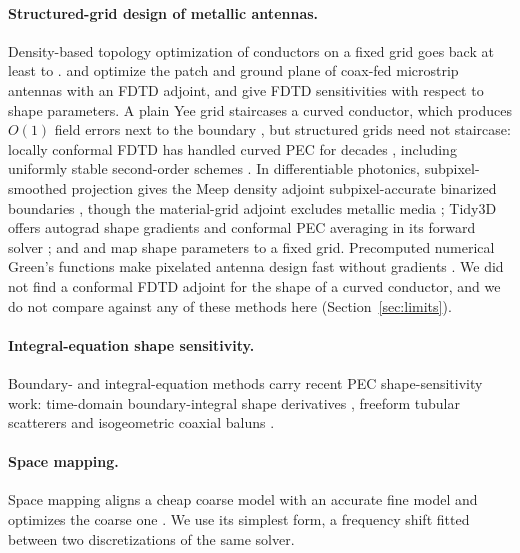 \documentclass{anvil-paper}
\begin{document}
\paragraph{Structured-grid design of metallic antennas.}
Density-based topology optimization of conductors on a fixed grid goes
back at least to \citet{erentok2011topology}. \citet{hassan2014topology}
and \citet{hassan2014patch} optimize the patch and ground plane of
coax-fed microstrip antennas with an FDTD adjoint, and
\citet{nikolova2004sensitivity,nikolova2006scattering} give FDTD
sensitivities with respect to shape parameters. A plain Yee grid
staircases a curved conductor, which produces $O(1)$ field errors next to
the boundary \citep{cangellaris1991analysis,haggblad2014accuracy}, but
structured grids need not staircase: locally conformal FDTD has handled
curved PEC for decades \citep{dey1997locally,mittra2000conformal},
including uniformly stable second-order schemes
\citep{zagorodnov2003uniformly,benkler2006new}. In differentiable
photonics, subpixel-smoothed projection gives the Meep density adjoint
subpixel-accurate binarized boundaries \citep{hammond2025unifying,romano2026ssp2},
though the material-grid adjoint excludes metallic media
\citep{meepadjointdocs}; Tidy3D offers autograd shape gradients and
conformal PEC averaging in its forward solver \citep{tidy3dautograd}; and
\citet{hooten2025} and \citet{liu2024imagerep} map shape parameters to a
fixed grid. Precomputed numerical Green's functions make pixelated antenna
design fast without gradients \citep{sun2025pngf}. We did not find a
conformal FDTD adjoint for the shape of a curved conductor, and we do not
compare against any of these methods here (Section~\ref{sec:limits}).

\paragraph{Integral-equation shape sensitivity.}
Boundary- and integral-equation methods carry recent PEC shape-sensitivity
work: time-domain boundary-integral shape derivatives
\citep{takahashi2025tdbie}, freeform tubular scatterers
\citep{arens2026tubular} and isogeometric coaxial baluns
\citep{balouchev2024balun}.

\paragraph{Space mapping.}
Space mapping aligns a cheap coarse model with an accurate fine model and
optimizes the coarse one \citep{bandler1994space,bandler2004space}. We use
its simplest form, a frequency shift fitted between two discretizations of
the same solver.
\end{document}
